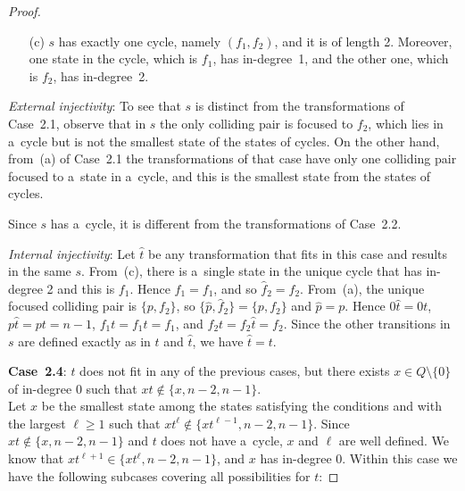 \documentclass{amsart}
\renewcommand{\ge}{\geqslant}
\newcommand{\e}[1]{\hat{#1}}
\begin{document}
\begin{proof}
\begin{enumerate}
\item[(c)] $s$ has exactly one cycle, namely $(f_1,f_2)$, and it is of length 2.
Moreover, one state in the cycle, which is $f_1$, has in-degree~1, and the other one, which is $f_2$, has in-degree~2.
\end{enumerate}

\textit{External injectivity}:
To see that $s$ is distinct from the transformations of Case~2.1, observe that in $s$ the only colliding pair is focused to $f_2$, which lies in a~cycle but is not the smallest state of the states of cycles.
On the other hand, from~(a) of Case~2.1 the transformations of that case have only one colliding pair focused to a~state in a~cycle, and this is the smallest state from the states of cycles.

Since $s$ has a~cycle, it is different from the transformations of Case~2.2.

\textit{Internal injectivity}:
Let $\e{t}$ be any transformation that fits in this case and results in the same $s$.
From~(c), there is a~single state in the unique cycle that has in-degree 2 and this is $f_1$. Hence $\e{f}_1 = f_1$, and so $\e{f}_2 = f_2$.
From~(a), the unique focused colliding pair is $\{p,f_2\}$, so $\{\e{p},\e{f}_2\}=\{p,f_2\}$ and $\e{p} = p$.
Hence $0\e{t} = 0t$, $p\e{t} = pt = n-1$, $f_1 t = f_1 \e{t} = f_1$, and $f_2 t = f_2 \e{t} = f_2$.
Since the other transitions in $s$ are defined exactly as in $t$ and $\e{t}$, we have $\e{t} = t$.

\textbf{Case~2.4}: $t$ does not fit in any of the previous cases, but there exists $x \in Q\setminus \{0\}$ of in-degree $0$ such that $xt \notin \{x,n-2,n-1\}$.\\
Let $x$ be the smallest state among the states satisfying the conditions and with the largest $\ell\ge 1$ such that $xt^\ell \notin \{xt^{\ell-1},n-2,n-1\}$.
Since $xt \notin \{x,n-2,n-1\}$ and $t$ does not have a~cycle, $x$ and $\ell$ are well defined.
We know that $xt^{\ell+1} \in \{xt^\ell,n-2,n-1\}$, and $x$ has in-degree $0$.
Within this case we have the following subcases covering all possibilities for $t$:


\end{proof}
\end{document}
